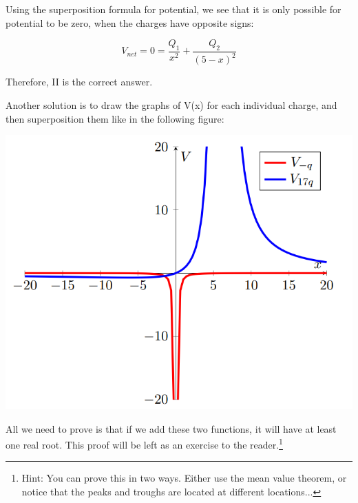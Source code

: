\begin{solution}
Using the superposition formula for potential, we see that it is only possible for potential to be zero, when the charges have opposite signs:

\begin{equation*}
    V_{net}=0=\frac{Q_1}{x^2}+\frac{Q_2}{(5-x)^2}
\end{equation*}

Therefore, II is the correct answer.

Another solution is to draw the graphs of V(x) for each individual charge, and then superposition them like in the following figure:

\begin{center}


\includegraphics{Figures/Figure28}
\end{center}

All we need to prove is that if we add these two functions, it will have at least one real root. This proof will be left as an exercise to the reader.\footnote{Hint: You can prove this in two ways. Either use the mean value theorem, or notice that the peaks and troughs are located at different locations...}

\end{solution}

